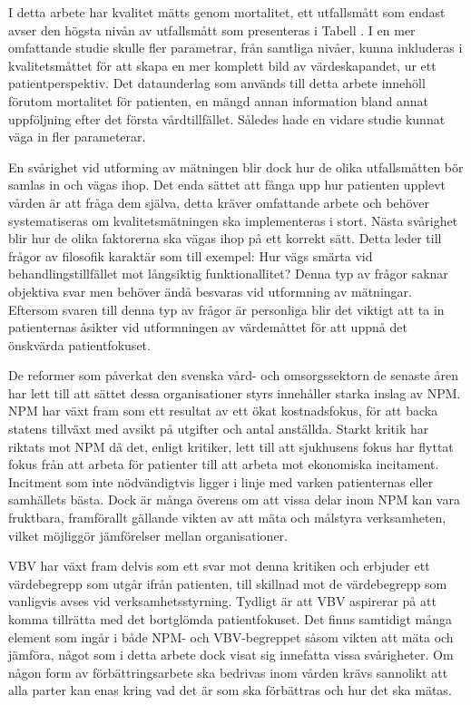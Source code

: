 I detta arbete har kvalitet mätts genom mortalitet, ett utfallsmått som endast avser den högsta nivån av utfallsmått som presenteras i Tabell \label{tab:livslangd}. I en mer omfattande studie skulle fler parametrar, från samtliga nivåer, kunna inkluderas i kvalitetsmåttet för att skapa en mer komplett bild av värdeskapandet, ur ett patientperspektiv. Det dataunderlag som används till detta arbete innehöll förutom mortalitet för patienten, en mängd annan information bland annat uppföljning efter det första vårdtillfället. Således hade en vidare studie kunnat väga in fler parameterar.

En svårighet vid utforming av mätningen blir dock hur de olika utfallsmåtten bör samlas in och vägas ihop. Det enda sättet att fånga upp hur patienten upplevt vården är att fråga dem själva, detta kräver omfattande arbete och behöver systematiseras om kvalitetsmätningen ska implementeras i stort. Nästa svårighet blir hur de olika faktorerna ska vägas ihop på ett korrekt sätt. Detta leder till frågor av filosofik karaktär som till exempel: Hur vägs smärta vid behandlingstillfället mot långsiktig funktionallitet?
Denna typ av frågor saknar objektiva svar men behöver ändå besvaras vid utformning av mätningar. Eftersom svaren till denna typ av frågor är personliga blir det viktigt att ta in patienternas åsikter vid utformningen av värdemåttet för att uppnå det önskvärda patientfokuset.

De reformer som påverkat den svenska vård- och omsorgssektorn de senaste åren har lett till att sättet dessa organisationer styrs innehåller starka inslag av NPM. NPM har växt fram som ett resultat av ett ökat kostnadsfokus, för att backa statens tillväxt med avsikt på utgifter och antal anställda. Starkt kritik har riktats mot NPM då det, enligt kritiker, lett till att sjukhusens fokus har flyttat fokus från att arbeta för patienter till att arbeta mot ekonomiska incitament. Incitment som inte nödvändigtvis ligger i linje med varken patienternas eller samhällets bästa. Dock är många överens om att vissa delar inom NPM kan vara fruktbara, framförallt gällande vikten av att mäta och målstyra verksamheten, vilket möjliggör jämförelser mellan organisationer. 

VBV har växt fram delvis som ett svar mot denna kritiken och erbjuder ett värdebegrepp som utgår ifrån patienten, till skillnad mot de värdebegrepp som vanligvis avses vid verksamhetsstyrning. Tydligt är att VBV aspirerar på att komma tillrätta med det bortglömda patientfokuset. Det finns samtidigt många element som ingår i både NPM- och VBV-begreppet såsom vikten att mäta och jämföra, något som i detta arbete dock visat sig innefatta vissa svårigheter. Om någon form av förbättringsarbete ska bedrivas inom vården krävs sannolikt att alla parter kan enas kring vad det är som ska förbättras och hur det ska mätas.

